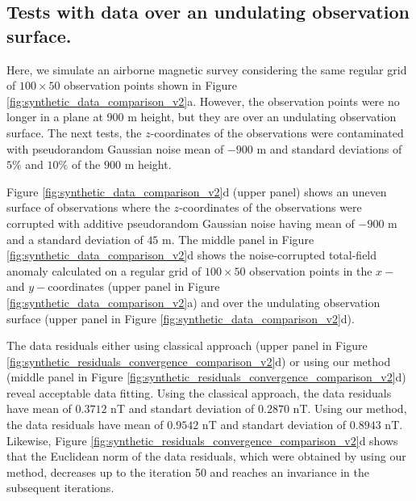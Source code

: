 \subsection*{Tests with data over an undulating observation surface.}

Here, we simulate an airborne magnetic survey considering the same regular grid of $100 \times 50$ observation points shown in Figure  \ref{fig:synthetic_data_comparison_v2}a.
However, the observation points were no longer in a plane at $900$ m height, 
but they are over an undulating observation surface.
The next tests, the $z$-coordinates of the observations were contaminated with 
pseudorandom Gaussian noise mean of $- 900$ m and standard deviations of $5\%$ and $10\%$ of the $900$ m height.


Figure \ref{fig:synthetic_data_comparison_v2}d (upper panel) shows an uneven surface of observations where  the $z$-coordinates of the observations were corrupted with additive  pseudorandom Gaussian noise having mean of  $- 900$ m  and a standard deviation of $45$ m.
The middle panel in Figure \ref{fig:synthetic_data_comparison_v2}d shows the noise-corrupted total-field anomaly calculated on a regular grid  of $100 \times 50$ observation points in the $x-$ and $y-$coordinates 
(upper panel in Figure  \ref{fig:synthetic_data_comparison_v2}a) and
over the undulating observation surface (upper panel in Figure \ref{fig:synthetic_data_comparison_v2}d).
 
The data residuals either using classical approach 
(upper panel in Figure \ref{fig:synthetic_residuals_convergence_comparison_v2}d) or
using our method (middle panel in Figure \ref{fig:synthetic_residuals_convergence_comparison_v2}d) reveal acceptable data fitting.
Using the classical approach, the data residuals have mean of $0.3712$ nT 
and standart deviation of $0.2870$ nT.
Using our method, the data residuals have mean of $0.9542$ nT and standart deviation of $0.8943$ nT. 
Likewise,  Figure \ref{fig:synthetic_residuals_convergence_comparison_v2}d shows that the Euclidean norm of the data residuals, which were obtained by using our method, decreases up to the iteration 50  
and reaches an invariance in the subsequent iterations.  

